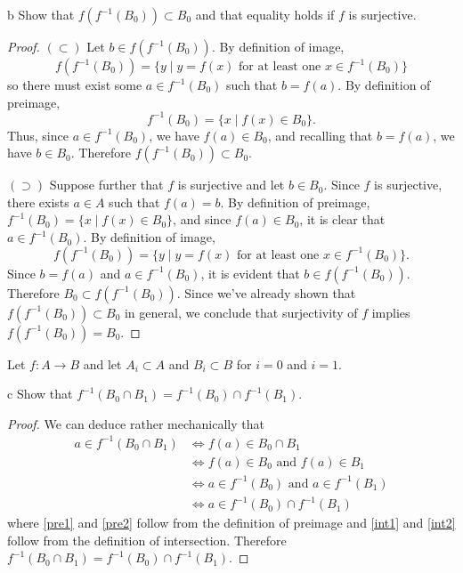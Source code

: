 \documentclass[11pt]{article}
\begin{document}
\begin{p}{b}
  Show that $f(f^{-1}(B_0)) \subset B_0$ and that equality holds if $f$ is surjective.
\end{p}

\begin{proof}
  $(\subset)$ Let $b \in f(f^{-1}(B_0))$. By definition of image,
  $$f(f^{-1}(B_0)) = \{ y \mid y = f(x) \text{ for at least one } x \in f^{-1}(B_0)\}$$
  so there must exist some $a \in f^{-1}(B_0)$ such that $b = f(a)$.
  By definition of preimage,
  $$ f^{-1}(B_0) = \{ x \mid f(x) \in B_0 \}.$$
  Thus, since $ a \in f^{-1}(B_0)$, we have $f(a) \in B_0$, and recalling that
  $b = f(a)$, we have $b \in B_0$. Therefore $f(f^{-1}(B_0)) \subset B_0$.

  $(\supset)$ Suppose further that $f$ is surjective and let $b \in B_0$. Since
  $f$ is surjective, there exists $a \in A$ such that $f(a) = b$. By definition
  of preimage, $f^{-1}(B_0) = \{ x \mid f(x) \in B_0 \}$, and since $f(a) \in
  B_0$, it is clear that $a \in f^{-1}(B_0)$. By definition of image,
  $$ f(f^{-1}(B_0)) = \{ y \mid y = f(x) \text{ for at least one } x \in f^{-1}(B_0) \}.$$
  Since $b = f(a)$ and $a \in f^{-1}(B_0)$, it is evident that $b \in
  f(f^{-1}(B_0))$. Therefore $B_0 \subset f(f^{-1}(B_0))$. Since we've already
  shown that $f(f^{-1}(B_0)) \subset B_0$ in general, we conclude that
  surjectivity of $f$ implies $f(f^{-1}(B_0)) = B_0$.

\end{proof}

\begin{ex}{2.2}
  Let $f: A \to B$ and let $A_i \subset A$ and $B_i \subset B$ for $i=0$ and $i=1$.
\end{ex}

\begin{p}{c}
  Show that $f^{-1}(B_0 \cap B_1) = f^{-1}(B_0) \cap f^{-1}(B_1)$.
\end{p}

\begin{proof}
  We can deduce rather mechanically that
  \begin{align}
    a \in f^{-1}(B_0 \cap B_1)
      &\iff f(a) \in B_0 \cap B_1 \label{pre1} \\
      &\iff f(a) \in B_0 \text{ and } f(a) \in B_1 \label{int1} \\
      &\iff a \in f^{-1}(B_0) \text{ and } a \in f^{-1}(B_1) \label{pre2} \\
      &\iff a \in f^{-1}(B_0) \cap f^{-1}(B_1) \label{int2}
  \end{align}
  where \eqref{pre1} and \eqref{pre2} follow from the definition of preimage and
  \eqref{int1} and \eqref{int2} follow from the definition of intersection. Therefore
  $f^{-1}(B_0 \cap B_1) = f^{-1}(B_0) \cap f^{-1}(B_1)$.
\end{proof}
\end{document}
